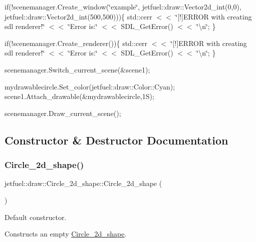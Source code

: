 if(!scenemanager.Create\+\_\+window(\char`\"{}example\char`\"{}, jetfuel\+::draw\+::\+Vector2d\+\_\+int(0,0), jetfuel\+::draw\+::\+Vector2d\+\_\+int(500,500)))\{ std\+::cerr $<$$<$ \char`\"{}\mbox{[}!\mbox{]}\+E\+R\+R\+O\+R with creating sdl renderer!\char`\"{} $<$$<$ \char`\"{}\+Error is\+:\char`\"{} $<$$<$ S\+D\+L\+\_\+\+Get\+Error() $<$$<$ \char`\"{}\textbackslash{}n\char`\"{}; \}

if(!scenemanager.Create\+\_\+renderer())\{ std\+::cerr $<$$<$ \char`\"{}\mbox{[}!\mbox{]}\+E\+R\+R\+O\+R with creating sdl renderer!\char`\"{} $<$$<$ \char`\"{}\+Error is\+:\char`\"{} $<$$<$ S\+D\+L\+\_\+\+Get\+Error() $<$$<$ \char`\"{}\textbackslash{}n\char`\"{}; \}

scenemanager.\+Switch\+\_\+current\+\_\+scene(\&scene1);

mydrawablecircle.\+Set\+\_\+color(jetfuel\+::draw\+::\+Color\+::\+Cyan); scene1.\+Attach\+\_\+drawable(\&mydrawablecircle,1\+S);

scenemanager.\+Draw\+\_\+current\+\_\+scene(); 

\subsection{Constructor \& Destructor Documentation}
\mbox{\label{classjetfuel_1_1draw_1_1Circle__2d__shape_a0c6320cecb7ee7bfff185f4607a5f830}} 
\subsubsection{\texorpdfstring{Circle\+\_\+2d\+\_\+shape()}{Circle\_2d\_shape()}\hspace{0.1cm}{\footnotesize\ttfamily [1/2]}}
{\footnotesize\ttfamily jetfuel\+::draw\+::\+Circle\+\_\+2d\+\_\+shape\+::\+Circle\+\_\+2d\+\_\+shape (\begin{DoxyParamCaption}{ }\end{DoxyParamCaption})\hspace{0.3cm}{\ttfamily [inline]}}



Default constructor. 

Constructs an empty \hyperlink{classjetfuel_1_1draw_1_1Circle__2d__shape}{Circle\+\_\+2d\+\_\+shape}. \mbox{\label{classjetfuel_1_1draw_1_1Circle__2d__shape_ad2be0a546c65e671a92dd30e20461afe}} 
